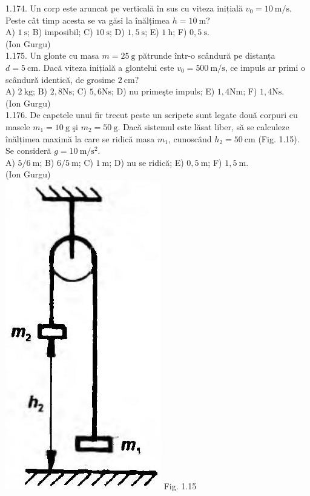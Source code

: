 1.174. Un corp este aruncat pe verticală în sus cu viteza inițială $v_{0}=10 \mathrm{~m} / \mathrm{s}$. Peste cât timp acesta se va găsi la înălțimea $h=10 \mathrm{~m}$?\\ A) $1 \mathrm{~s}$; B) imposibil; C) $10 \mathrm{~s}$; D) $1,5 \mathrm{~s}$; E) $1 \mathrm{~h}$; F) $0,5 \mathrm{~s}$.\\ (Ion Gurgu)\\

1.175. Un glonte cu masa $m=25 \mathrm{~g}$ pătrunde într-o scândură pe distanța $d=5 \mathrm{~cm}$. Dacă viteza inițială a glontelui este $v_{0}=500 \mathrm{~m} / \mathrm{s}$, ce impuls ar primi o scândură identică, de grosime $2 \mathrm{~cm}?$\\ A) $2 \mathrm{~kg}$; B) $2,8 \mathrm{Ns}$; C) $5,6 \mathrm{Ns}$; D) nu primeşte impuls; E) $1,4 \mathrm{Nm}$; F) $1,4 \mathrm{Ns}$.\\ (Ion Gurgu)\\

1.176. De capetele unui fir trecut peste un scripete sunt legate două corpuri cu masele $m_{1}=10 \mathrm{~g}$ şi $m_{2}=50 \mathrm{~g}$. Dacă sistemul este lăsat liber, să se calculeze înălțimea maximă la care se ridică masa $m_{1}$, cunoscând $h_{2}=50 \mathrm{~cm}$ (Fig. 1.15). Se consideră $g=10 \mathrm{~m} / \mathrm{s}^{2}$.\\ A) $5 / 6 \mathrm{~m}$; B) $6 / 5 \mathrm{~m}$; C) $1 \mathrm{~m}$; D) nu se ridică; E) $0,5 \mathrm{~m}$; F) $1,5 \mathrm{~m}$.\\ (Ion Gurgu)\\ \includegraphics[width=0.4\linewidth]{images/2025_07_01_5b3ff9fa0d508c8e9f17g-042} Fig. 1.15\\

